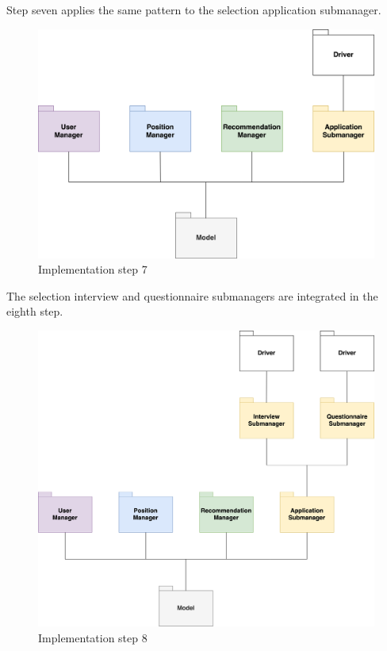 \newpage
Step seven applies the same pattern to the selection application submanager.

\begin{figure}[h]
    \centering
    \includegraphics[width=13cm]{images/implementation-diagrams/step-7.png}
    \caption{Implementation step 7}
\end{figure}

\newpage
The selection interview and questionnaire submanagers are integrated in the eighth step.

\begin{figure}[h]
    \centering
    \includegraphics[width=14.5cm]{images/implementation-diagrams/step-8.png}
    \caption{Implementation step 8}
\end{figure}

